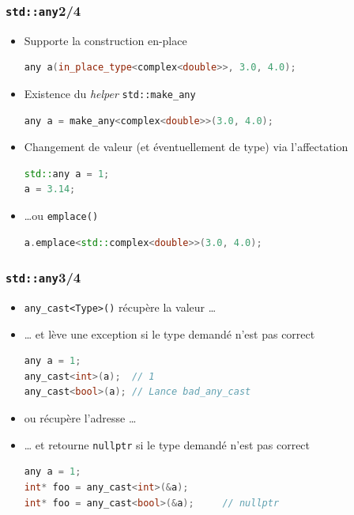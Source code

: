 \documentclass[C++.tex]{subfiles}
\begin{document}
\begin{frame}[fragile]
	\frametitle{\lstinline|std::any|\titlehfill{}2/4}
	\begin{itemize}
		\item Supporte la construction \og en-place\fg{}

			\begin{lstlisting}[language=C++]
any a(in_place_type<complex<double>>, 3.0, 4.0);\end{lstlisting}

		\item Existence du \textit{helper} \lstinline|std::make_any|

			\begin{lstlisting}[language=C++]
any a = make_any<complex<double>>(3.0, 4.0);\end{lstlisting}

		\item Changement de valeur (et éventuellement de type) via l'affectation

			\begin{lstlisting}[language=C++]
std::any a = 1;
a = 3.14;
\end{lstlisting}
	
		\item \ldots ou \lstinline|emplace()|
			\begin{lstlisting}[language=C++]
a.emplace<std::complex<double>>(3.0, 4.0);
\end{lstlisting}

	\end{itemize}
\end{frame}

\begin{frame}[fragile]
	\frametitle{\lstinline|std::any|\titlehfill{}3/4}
	\begin{itemize}
		\item \lstinline|any_cast<Type>()| récupère la valeur \ldots
		\item \ldots{} et lève une exception si le type demandé n'est pas correct

		\begin{lstlisting}[language=C++]
any a = 1;
any_cast<int>(a);  // 1
any_cast<bool>(a); // Lance bad_any_cast\end{lstlisting}

		\item ou récupère l'adresse \ldots
		\item \ldots{} et retourne \lstinline|nullptr| si le type demandé n'est pas correct

		\begin{lstlisting}[language=C++]
any a = 1;
int* foo = any_cast<int>(&a);
int* foo = any_cast<bool>(&a);     // nullptr\end{lstlisting}
	\end{itemize}
\end{frame}
\end{document}
